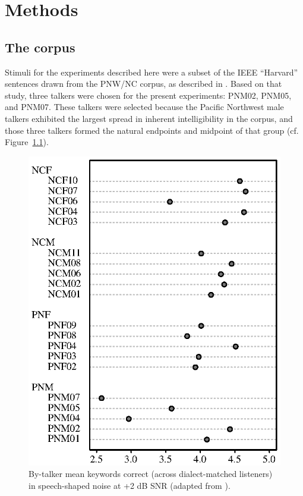 \chapter{Methods}
\section{The corpus}
Stimuli for the experiments described here were a subset of the IEEE “Harvard” sentences \citep{HarvardSents} drawn from the PNW/NC corpus, as described in \citet{McCloyEtAl2013}.  Based on that study, three talkers were chosen for the present experiments: PNM02, PNM05, and PNM07.  These talkers were selected because the Pacific Northwest male talkers exhibited the largest spread in inherent intelligibility in the corpus, and those three talkers formed the natural endpoints and midpoint of that group (cf. Figure~\ref{fig:dotchart}).

\begin{figure}
	\begin{centering}
	\includegraphics{figures/dotchart.eps}
	\caption[Intelligibility of talkers used to make the stimuli]{By-talker mean keywords correct (across dialect-matched listeners) in speech-shaped noise at +2 dB SNR (adapted from \citet{McCloyEtAl2013}).\label{fig:dotchart}}
	\end{centering}
\end{figure}

